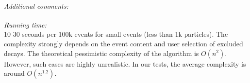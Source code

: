 \begin{small}
   \\
{\em Additional comments:}\\
   \\
{\em Running time:}\\
10-30 seconds per 100k events for small events (less than 1k particles).
The complexity strongly depends on the event content and user selection
of excluded decays. The theoretical pessimistic complexity of the algorithm is $O(n^2)$.
However, such cases are highly unrealistic.
In our tests, the average complexity is around $O(n^{1.2})$. \\
   \\
\end{small}

